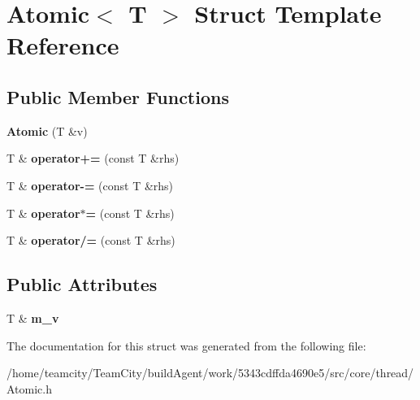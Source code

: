 \hypertarget{structAtomic}{}\section{Atomic$<$ T $>$ Struct Template Reference}
\label{structAtomic}
\subsection*{Public Member Functions}
\begin{DoxyCompactItemize}
\item 
{\bfseries Atomic} (T \&v)\hypertarget{structAtomic_a2997eca4631493cb3d5f7bbd02012517}{}\label{structAtomic_a2997eca4631493cb3d5f7bbd02012517}

\item 
T \& {\bfseries operator+=} (const T \&rhs)\hypertarget{structAtomic_a1d06a25a2b3a44a9f575030b02dacf41}{}\label{structAtomic_a1d06a25a2b3a44a9f575030b02dacf41}

\item 
T \& {\bfseries operator-\/=} (const T \&rhs)\hypertarget{structAtomic_a9b698d00b94a57bd04ecc1d4aa406e7a}{}\label{structAtomic_a9b698d00b94a57bd04ecc1d4aa406e7a}

\item 
T \& {\bfseries operator$\ast$=} (const T \&rhs)\hypertarget{structAtomic_a3453eac863d6fae62b20d1b0b6bbcc75}{}\label{structAtomic_a3453eac863d6fae62b20d1b0b6bbcc75}

\item 
T \& {\bfseries operator/=} (const T \&rhs)\hypertarget{structAtomic_aa9143d0b7becfb0f724a24be3dc2ef4a}{}\label{structAtomic_aa9143d0b7becfb0f724a24be3dc2ef4a}

\end{DoxyCompactItemize}
\subsection*{Public Attributes}
\begin{DoxyCompactItemize}
\item 
T \& {\bfseries m\+\_\+v}\hypertarget{structAtomic_ab31f90d99eb45d5305f7d19cb8d2ea6e}{}\label{structAtomic_ab31f90d99eb45d5305f7d19cb8d2ea6e}

\end{DoxyCompactItemize}


The documentation for this struct was generated from the following file\+:\begin{DoxyCompactItemize}
\item 
/home/teamcity/\+Team\+City/build\+Agent/work/5343cdffda4690e5/src/core/thread/Atomic.\+h\end{DoxyCompactItemize}
